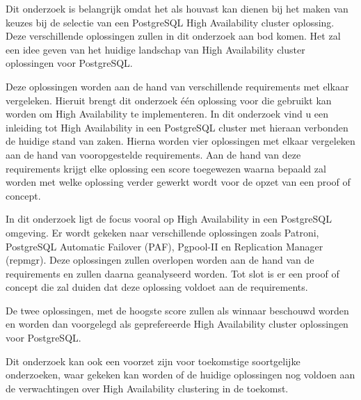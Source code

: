 
Dit onderzoek is belangrijk omdat het als houvast kan dienen bij het maken van keuzes bij de selectie van een PostgreSQL High Availability cluster oplossing. Deze verschillende oplossingen zullen in dit onderzoek aan bod komen. Het zal een idee geven van het huidige landschap van High Availability cluster oplossingen voor PostgreSQL.

Deze oplossingen worden aan de hand van verschillende requirements met elkaar vergeleken. Hieruit brengt dit onderzoek één oplossing voor die gebruikt kan worden om High Availability te implementeren. In dit onderzoek vind u een inleiding tot High Availability in een PostgreSQL cluster met hieraan verbonden de huidige stand van zaken. Hierna worden vier oplossingen met elkaar vergeleken aan de hand van vooropgestelde requirements. Aan de hand van deze requirements krijgt elke oplossing een score toegewezen waarna bepaald zal worden met welke oplossing verder gewerkt wordt voor de opzet van een proof of concept.

In dit onderzoek ligt de focus vooral op High Availability in een PostgreSQL omgeving. Er wordt gekeken naar verschillende oplossingen zoals Patroni, PostgreSQL Automatic Failover (PAF), Pgpool-II en Replication Manager (repmgr). Deze oplossingen zullen overlopen worden aan de hand van de requirements en zullen daarna geanalyseerd worden. Tot slot is er een proof of concept die zal duiden dat deze oplossing voldoet aan de requirements.

De twee oplossingen, met de hoogste score zullen als winnaar beschouwd worden en worden dan voorgelegd als geprefereerde High Availability cluster oplossingen voor PostgreSQL.

Dit onderzoek kan ook een voorzet zijn voor toekomstige soortgelijke onderzoeken, waar gekeken kan worden of de huidige oplossingen nog voldoen aan de verwachtingen over High Availability clustering in de toekomst.


